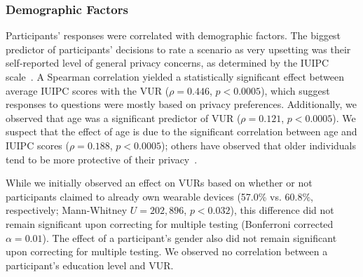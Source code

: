 \subsubsection{Demographic Factors}

Participants' responses were correlated with demographic factors. The biggest predictor of participants' decisions to rate a scenario as very upsetting was their self-reported level of general privacy concerns, as determined by the IUIPC scale~\cite{malhotra2004internet}. A Spearman correlation yielded a statistically significant effect between average IUIPC scores with the VUR ($\rho=0.446$, $p<0.0005$), which suggest responses to questions were mostly based on privacy preferences. Additionally, we observed that age was a significant predictor of VUR ($\rho=0.121$, $p<0.0005$). We suspect that the effect of age is due to the significant correlation between age and IUIPC scores ($\rho=0.188$, $p<0.0005$); others have observed that older individuals tend to be more protective of their privacy~\cite{varian2005demographics}.

While we initially observed an effect on VURs based on whether or not participants claimed to already own wearable devices (57.0\% vs. 60.8\%, respectively; Mann-Whitney $U=202,896$, $p<0.032$), this difference did not remain significant upon correcting for multiple testing (Bonferroni corrected $\alpha=0.01$). The effect of a participant's gender also did not remain significant upon correcting for multiple testing. We observed no correlation between a participant's education level and VUR.